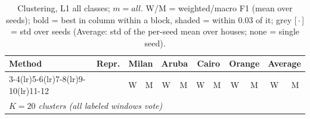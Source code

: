 \begin{table}[H]
\centering\small
\caption{Clustering, L1 all classes; $m=all$. W/M = weighted/macro F1 (mean over seeds); bold = best in column within a block, shaded = within 0.03 of it; grey [\,$\cdot$\,] = std over seeds (Average: std of the per-seed mean over houses; none = single seed).}
\label{tab:clu_l1_all_mall}
\setlength{\tabcolsep}{3.2pt}
\begin{tabular}{llcc|cc|cc|cc|cc}
\toprule
Method & Repr. & \multicolumn{2}{c}{Milan} & \multicolumn{2}{c}{Aruba} & \multicolumn{2}{c}{Cairo} & \multicolumn{2}{c}{Orange} & \multicolumn{2}{c}{Average} \\
\cmidrule(lr){3-4}\cmidrule(lr){5-6}\cmidrule(lr){7-8}\cmidrule(lr){9-10}\cmidrule(lr){11-12}
 & & W & M & W & M & W & M & W & M & W & M \\
\midrule
\multicolumn{12}{l}{\textit{$K = 20$ clusters (all labeled windows vote)}} \\
\midrule

\end{tabular}
\end{table}

